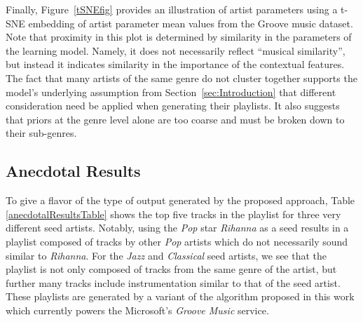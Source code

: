  
Finally, Figure~\ref{tSNEfig} provides an illustration of artist parameters using a t-SNE embedding \cite{Maaten2008} of artist parameter mean values from the Groove music dataset. 
Note that proximity in this plot is determined by similarity in the parameters of the learning model. Namely, it does not necessarily reflect ``musical similarity'', but instead it indicates similarity in the importance of the contextual features. The fact that many artists of the same genre do not cluster together supports the model's underlying assumption from Section~\ref{sec:Introduction} that different consideration need be applied when generating their playlists. It also suggests that priors at the genre level alone are too coarse and must be broken down to their sub-genres. 



\subsection{Anecdotal Results}
To give a flavor of the type of output generated by the proposed approach, Table \ref{anecdotalResultsTable} shows the top five tracks in the playlist for three very different seed artists. Notably, using the \textit{Pop} star \textit{Rihanna} as a seed results in a playlist composed of tracks by other \textit{Pop} artists which do not necessarily sound similar to \textit{Rihanna}. For the \textit{Jazz} and \textit{Classical} seed artists, we see that the playlist is not only composed of tracks from the same genre of the artist, but further many tracks include instrumentation similar to that of the seed artist. These playlists are generated by a variant of the algorithm proposed in this work which currently powers the Microsoft's \textit{Groove Music} service.



